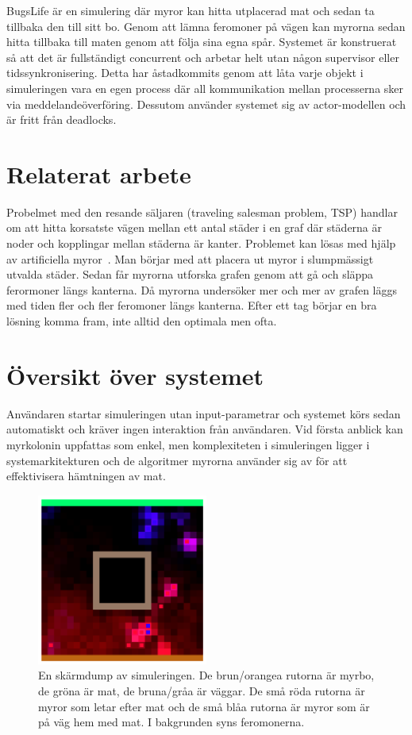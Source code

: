 \documentclass[12pt]{article}
\begin{document}
BugsLife är en simulering där myror kan hitta utplacerad mat och sedan ta tillbaka den till sitt bo.
Genom att lämna feromoner på vägen kan myrorna sedan hitta tillbaka till maten genom att följa sina egna spår.
Systemet är konstruerat så att det är fullständigt concurrent och arbetar helt utan någon supervisor eller tidssynkronisering.
Detta har åstadkommits genom att låta varje objekt i simuleringen vara en egen process där all kommunikation mellan processerna sker via meddelandeöverföring.
Dessutom använder systemet sig av actor-modellen och är fritt från deadlocks.

\section{Relaterat arbete}
Probelmet med den resande säljaren (traveling salesman problem, TSP) handlar om att hitta korsatste vägen mellan ett antal städer i en graf där städerna är noder och kopplingar mellan städerna är kanter.
Problemet kan lösas med hjälp av artificiella myror~\cite{dorigo1997ant}.
Man börjar med att placera ut myror i slumpmässigt utvalda städer.
Sedan får myrorna utforska grafen genom att gå och släppa ferormoner längs kanterna.
Då myrorna undersöker mer och mer av grafen läggs med tiden fler och fler feromoner längs kanterna.
Efter ett tag börjar en bra lösning komma fram, inte alltid den optimala men ofta.

\section{Översikt över systemet}
Användaren startar simuleringen utan input-parametrar och systemet körs sedan automatiskt och kräver ingen interaktion från användaren.
Vid första anblick kan myrkolonin uppfattas som enkel,
men komplexiteten i simuleringen ligger i systemarkitekturen och de algoritmer myrorna använder sig av för att effektivisera hämtningen av mat.

\begin{figure}[H]
    \centering
    \includegraphics[width=0.5\textwidth]{BugsLife-Fig1.png}
    \caption{
        En skärmdump av simuleringen.
        De brun/orangea rutorna är myrbo,
        de gröna är mat,
        de bruna/gråa är väggar.
        De små röda rutorna är myror som letar efter mat och de små blåa rutorna är myror som är på väg hem med mat.
        I bakgrunden syns feromonerna.
    }\label{fig:screen-dump}
\end{figure}
\end{document}
